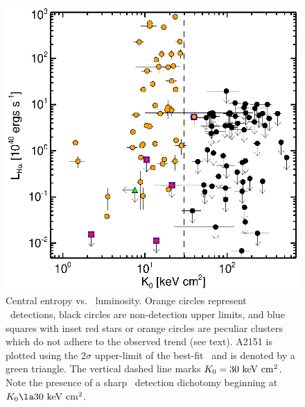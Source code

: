 \documentclass[12pt,preprint]{aastex}
\begin{document}
\clearpage
\begin{figure}
  \begin{center}
    \includegraphics*[width=\columnwidth, trim=28mm 7mm 40mm 17mm, clip]{f1.eps}
    \caption{Central entropy vs. \halpha\ luminosity. Orange circles
      represent \halpha\ detections, black circles are non-detection
      upper limits, and blue squares with inset red stars or orange
      circles are peculiar clusters which do not adhere to the
      observed trend (see text). A2151 is plotted using the 2$\sigma$
      upper-limit of the best-fit \kna\ and is denoted by a green
      triangle. The vertical dashed line marks $K_0 = 30 \mathrm{\mbox{\ensuremath{\mathrm{~keV}}} \mathrm{\mbox{\ensuremath{\mathrm{~cm}}}^2}}$. Note
      the presence of a sharp \halpha\ detection dichotomy beginning
      at $\kna \la 30 \ent$.}
    \label{fig:ha}
  \end{center}
\end{figure}
\end{document}

